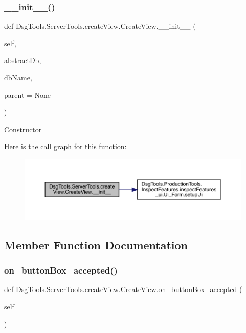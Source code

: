 \subsubsection{\texorpdfstring{\+\_\+\+\_\+init\+\_\+\+\_\+()}{\_\_init\_\_()}}
{\footnotesize\ttfamily def Dsg\+Tools.\+Server\+Tools.\+create\+View.\+Create\+View.\+\_\+\+\_\+init\+\_\+\+\_\+ (\begin{DoxyParamCaption}\item[{}]{self,  }\item[{}]{abstract\+Db,  }\item[{}]{db\+Name,  }\item[{}]{parent = {\ttfamily None} }\end{DoxyParamCaption})}

\begin{DoxyVerb}Constructor
\end{DoxyVerb}
 Here is the call graph for this function\+:
\nopagebreak
\begin{figure}[H]
\begin{center}
\leavevmode
\includegraphics[width=350pt]{class_dsg_tools_1_1_server_tools_1_1create_view_1_1_create_view_a62511984c864bd4f80d2a0f3311e223b_cgraph}
\end{center}
\end{figure}


\subsection{Member Function Documentation}
\mbox{\label{class_dsg_tools_1_1_server_tools_1_1create_view_1_1_create_view_ad3e078ea1620699d079930bacbfba94d}} 
\subsubsection{\texorpdfstring{on\+\_\+button\+Box\+\_\+accepted()}{on\_buttonBox\_accepted()}}
{\footnotesize\ttfamily def Dsg\+Tools.\+Server\+Tools.\+create\+View.\+Create\+View.\+on\+\_\+button\+Box\+\_\+accepted (\begin{DoxyParamCaption}\item[{}]{self }\end{DoxyParamCaption})}

